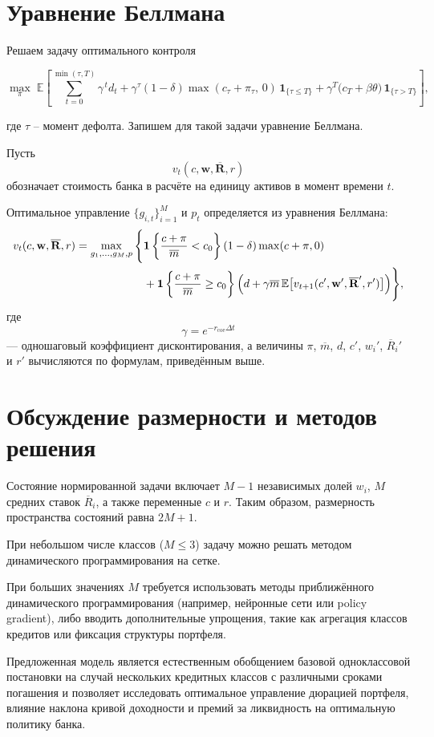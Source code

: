 \documentclass[11pt,a4paper]{article}
\newcommand{\1}{\mathbf{1}}
\newcommand{\E}{\mathbb{E}}
\begin{document}
\section{Уравнение Беллмана}

Решаем задачу оптимального контроля

\begin{equation}
    \max_{\pi}\; \mathbb{E}\left[
        \sum_{t=0}^{\min(\tau,T)} \gamma^{\,t} d_t
        + \gamma^{\tau} (1-\delta)\max(c_{\tau}+\pi_{\tau},\,0)\,\mathbf{1}_{\{\tau \le T\}}
        + \gamma^{T} \bigl(c_T + \beta\theta\bigr)\,\mathbf{1}_{\{\tau > T\}}
    \right],
\end{equation}

где $\tau$ -- момент дефолта. Запишем для такой задачи уравнение Беллмана.

Пусть
\[
v_t(c,\mathbf{w},\overline{\mathbf{R}},r)
\]
обозначает стоимость банка в расчёте на единицу активов в момент времени $t$.

Оптимальное управление $\{g_{i,t}\}_{i=1}^{M}$ и $p_t$ определяется из уравнения Беллмана:
\begin{equation}
\begin{aligned}
v_t(c,\mathbf{w},\overline{\mathbf{R}},r)
=
\max_{g_1,\dots,g_M,p}
\Bigg\{
&
\1\left\{
\frac{c+\pi}{\overline{m}}<c_0
\right\}
(1-\delta)\max(c+\pi,0)
\\
&
+
\1\left\{
\frac{c+\pi}{\overline{m}}\ge c_0
\right\}
\Bigl(
d
+
\gamma\overline{m}\,
\E\bigl[
v_{t+1}(c',\mathbf{w}',\overline{\mathbf{R}}',r')
\bigr]
\Bigr)
\Bigg\},
\end{aligned}
\end{equation}
где
\[
\gamma=e^{-r_{\text{coe}}\Delta t}
\]
--- одношаговый коэффициент дисконтирования, а величины $\pi$, $\overline{m}$, $d$, $c'$, $w_i'$, $\overline{R}_i'$ и $r'$ вычисляются по формулам, приведённым выше.

\section{Обсуждение размерности и методов решения}

Состояние нормированной задачи включает $M-1$ независимых долей $w_i$, $M$ средних ставок $\overline{R}_i$, а также переменные $c$ и $r$. Таким образом, размерность пространства состояний равна $2M+1$.

При небольшом числе классов ($M\le3$) задачу можно решать методом динамического программирования на сетке.

При больших значениях $M$ требуется использовать методы приближённого динамического программирования (например, нейронные сети или policy gradient), либо вводить дополнительные упрощения, такие как агрегация классов кредитов или фиксация структуры портфеля.

Предложенная модель является естественным обобщением базовой одноклассовой постановки на случай нескольких кредитных классов с различными сроками погашения и позволяет исследовать оптимальное управление дюрацией портфеля, влияние наклона кривой доходности и премий за ликвидность на оптимальную политику банка.
\end{document}
